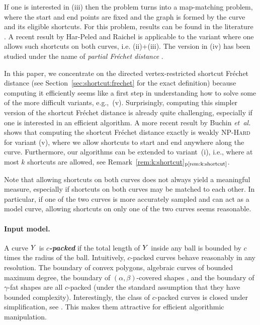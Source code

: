 \documentclass[12pt]{article}
\providecommand{\ComplexityClass}[1]{{{\textcolor[named]{OliveGreen}{\textsc{#1}}}}}
\providecommand{\NPHard}{{\ComplexityClass{NP-Hard}}\index{NP!hard}\xspace}
\newcommand{\secref}[1]{Section~\ref{sec:#1}}
\newcommand{\remrefpage}[1]{Remark~\ref{rem:#1}$_\text{p\pageref{rem:#1}}$}
\newcommand{\figlab}[1]{\label{fig:#1}}
\newcommand{\etal}{\textit{et~al.}\xspace}
\newcommand{\emphic}[2]{\textcolor{blue25}{\textbf{\emph{#1}}}\index{#2}}
\newcommand{\emphi}[1]{\emphic{#1}{#1}}
\newcommand{\Frechet}{Fr\'{e}c{h}e{}t\xspace}\providecommand{\Arr}{\mathop{\mathrm{\EuScript{A}}}}
\newcommand{\SimplifyX}[1]{#1}
\newcommand{\cY}{\SimplifyX{\cYBase}}
\newcommand{\AlphaBetaCovered}{$(\alpha,\beta)$-covered\xspace}
\numberwithin{figure}{section}
\numberwithin{equation}{section}
\newcommand{\vrestricted}{vertex-restricted}
\newcommand{\asymmetric}{directed}
\begin{document}
\parpic[r]{\begin{minipage}{0.25\linewidth}\texttt{[image: figs/hiking]}
       \figlab{shortcut:example}\end{minipage}}


If one is interested in (iii) then the problem turns into a
map-matching problem, where the start and end points are fixed and the
graph is formed by the curve and its eligible shortcuts. For this
problem, results can be found in the literature \cite{cdgnw-amm-11,
   aerw-mpm-03}. A recent result by Har-Peled and Raichel
\cite{hr-fdre-11} is applicable to the variant where one allows such
shortcuts on both curves, i.e. (ii)+(iii).  The version in (iv) has
been studied under the name of \emph{partial \Frechet distance}
\cite{bbw-eapcm-09}.

In this paper, we concentrate on the \asymmetric{} \vrestricted{}
shortcut \Frechet distance (see \secref{shortcut:frechet} for the
exact definition) because computing it efficiently seems like a first
step in understanding how to solve some of the more difficult
variants, e.g.,~(v).  Surprisingly, computing this simpler version of
the shortcut \Frechet distance is already quite challenging,
especially if one is interested in an efficient algorithm.  A more
recent result by Buchin \etal~\cite{bds-jnp-13, d-raapg-13} shows that
computing the shortcut \Frechet distance exactly is weakly \NPHard for
variant (v), where we allow shortcuts to start and end anywhere along
the curve.  Furthermore, our algorithms can be extended to
variant~(i), i.e., where at most $k$ shortcuts are allowed, see
\remrefpage{k:shortcut}.

Note that allowing shortcuts on both curves does not always yield a
meaningful measure, {especially if shortcuts on both curves may be
   matched to each other.  In particular, if one of the two curves is
   more accurately sampled and can act as a model curve, allowing
   shortcuts on only one of the two curves seems reasonable. }



\paragraph{Input model.} 
A curve $\cY$ is \emphi{$c$-packed} if the total length of $\cY$
inside any ball is bounded by $c$ times the radius of the ball.
Intuitively, $c$-packed curves behave reasonably in any resolution.
The boundary of convex polygons, algebraic curves of bounded maximum
degree, the boundary of \AlphaBetaCovered shapes \cite{e-cuabc-05},
and the boundary of $\gamma$-fat shapes \cite{d-ibucf-08} are all
$c$-packed (under the standard assumption that they have bounded
complexity).  Interestingly, the class of $c$-packed curves is closed
under simplification, see \cite{dhw-afdrc-12}. This makes them
attractive for efficient algorithmic manipulation.
\end{document}
